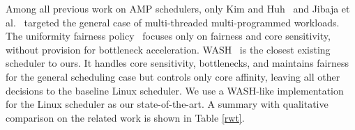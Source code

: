 
Among all previous work on AMP schedulers, only Kim and Huh~\cite{kim2018exploring} and Jibaja et al.~\cite{jibaja2016portable} targeted the general case of multi-threaded multi-programmed workloads. The uniformity fairness policy~\cite{kim2018exploring} focuses only on fairness and core sensitivity, without provision for bottleneck acceleration. WASH~\cite{jibaja2016portable} is the closest existing scheduler to ours. It handles core sensitivity, bottlenecks, and maintains fairness for the general scheduling case but controls only core affinity, leaving all other decisions to the baseline Linux scheduler. We use a WASH-like implementation for the Linux scheduler  as our state-of-the-art. A summary with qualitative comparison on the related work is shown in Table \ref{rwt}.


